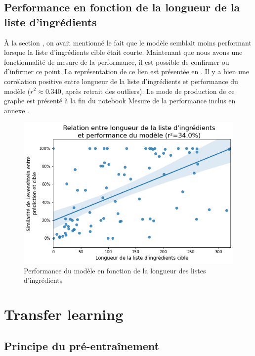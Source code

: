         \section{Performance en fonction de la longueur de la liste d'ingrédients}

        \`{A} la section , on avait mentionné le fait que le modèle semblait moins performant lorsque la liste d'ingrédients cible était courte.
        Maintenant que nous avons une fonctionnalité de mesure de la performance, il est possible de confirmer ou d'infirmer ce point.
        La représentation de ce lien est présentée en .
        Il y a bien une corrélation positive entre longueur de la liste d'ingrédients et performance du modèle ($r^{2} \approx 0.340$, après retrait des outliers).
        Le mode de production de ce graphe est présenté à la fin du notebook \og Mesure de la performance \fg inclus en annexe .
        \begin{figure}[htbp]
            \begin{center}
            \includegraphics[width=0.7\linewidth]{img/perf_vs_length.png}
            \end{center}
            \caption{Performance du modèle en fonction de la longueur des listes d'ingrédients}
            \label{fig:perf_vs_length}
        \end{figure}

        


    \chapter{Transfer learning}
        
        \section{Principe du pré-entraînement}
        
